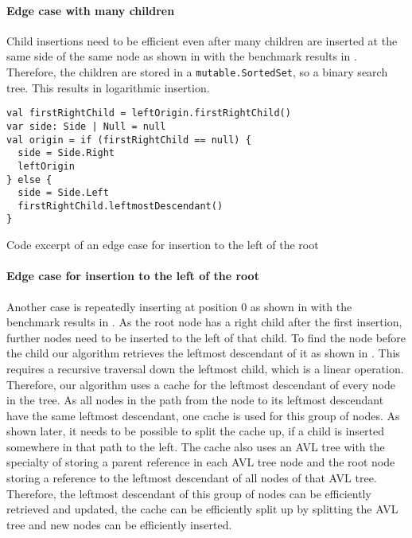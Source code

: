 \paragraph{Edge case with many children}

Child insertions need to be efficient even after many children are inserted at the same side of the same node as shown in  with the benchmark results in . Therefore, the children are stored in a \texttt{mutable.SortedSet}, so a binary search tree. This results in logarithmic insertion.



\begin{listing}
  \begin{verbatim}
val firstRightChild = leftOrigin.firstRightChild()
var side: Side | Null = null
val origin = if (firstRightChild == null) {
  side = Side.Right
  leftOrigin
} else {
  side = Side.Left
  firstRightChild.leftmostDescendant()
}
\end{verbatim}
  \caption{Code excerpt of an edge case for insertion to the left of the root}
  \label{lst:code-evil-insert-1}
\end{listing}

\paragraph{Edge case for insertion to the left of the root}

Another case is repeatedly inserting at position $0$ as shown in  with the benchmark results in .
As the root node has a right child after the first insertion, further nodes need to be inserted to the left of that child. To find the node before the child our algorithm retrieves the leftmost descendant of it as shown in . This requires a recursive traversal down the leftmost child, which is a linear operation. Therefore, our algorithm uses a cache for the leftmost descendant of every node in the tree. As all nodes in the path from the node to its leftmost descendant have the same leftmost descendant, one cache is used for this group of nodes. As shown later, it needs to be possible to split the cache up, if a child is inserted somewhere in that path to the left. The cache also uses an AVL tree with the specialty of storing a parent reference in each AVL tree node and the root node storing a reference to the leftmost descendant of all nodes of that AVL tree. Therefore, the leftmost descendant of this group of nodes can be efficiently retrieved and updated, the cache can be efficiently split up by splitting the AVL tree and new nodes can be efficiently inserted.

